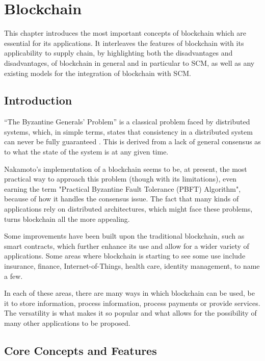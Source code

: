 \chapter{Blockchain}
\label{chap:blockchain}

\minitoc \mtcskip \noindent

This chapter introduces the most important concepts of blockchain which are essential for its applications. It interleaves the features of blockchain with its applicability to supply chain, by highlighting both the disadvantages and disadvantages, of blockchain in general and in particular to SCM, as well as any existing models for the integration of blockchain with SCM.

\section{Introduction}
“The Byzantine Generals' Problem” is a classical problem faced by distributed systems, which, in simple terms, states that consistency in a distributed system can never be fully guaranteed \cite{byzantine-generals-problem}. This is derived from a lack of general consensus as to what the state of the system is at any given time.

Nakamoto's implementation of a blockchain seems to be, at present, the most practical way to approach this problem (though with its limitations), even earning the term "Practical Byzantine Fault Tolerance (PBFT) Algorithm", because of how it handles the consensus issue. The fact that many kinds of applications rely on distributed architectures, which might face these problems, turns blockchain all the more appealing. 
   
Some improvements have been built upon the traditional blockchain, such as smart contracts, which further enhance its use and allow for a wider variety of applications. Some areas where blockchain is starting to see some use include insurance, finance, Internet-of-Things, health care, identity management, to name a few.

In each of these areas, there are many ways in which blockchain can be used, be it to store information, process information, process payments or provide services. The versatility is what makes it so popular and what allows for the possibility of many other applications to be proposed.

\section{Core Concepts and Features}

